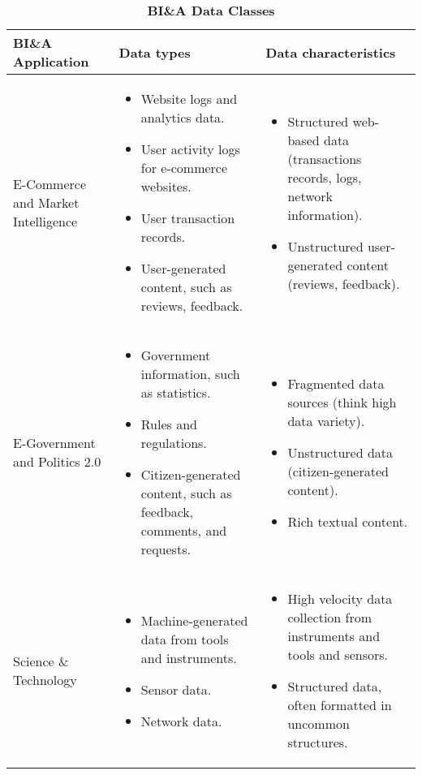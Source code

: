 \begin{landscape}

\begin{table}[H]
\footnotesize
\centering
\caption{\textbf{BI\&A Data Classes}}
\label{tab:bia_data_tab}

\begin{tabular}{ | p{4cm} | p{10cm} | p{10cm} | }

\hline
\textbf{BI\&A Application} & \textbf{Data types} & \textbf{Data characteristics} \\ \hline

E-Commerce and Market Intelligence
&
\begin{itemize}[leftmargin=*]
  \item Website logs and analytics data.
  \item User activity logs for e-commerce websites.
  \item User transaction records.
  \item User-generated content, such as reviews, feedback.
\end{itemize}
&
\begin{itemize}[leftmargin=*]
  \item Structured web-based data (transactions records, logs, network information).
  \item Unstructured user-generated content (reviews, feedback).
\end{itemize}
\\ \hline

E-Government and Politics 2.0
&
\begin{itemize}[leftmargin=*]
  \item Government information, such as statistics.
  \item Rules and regulations.
  \item Citizen-generated content, such as feedback, comments, and requests.
\end{itemize}
&
\begin{itemize}[leftmargin=*]
  \item Fragmented data sources (think high data variety).
  \item Unstructured data (citizen-generated content).
  \item Rich textual content.
\end{itemize}
\\ \hline

Science \& Technology
&
\begin{itemize}[leftmargin=*]
  \item Machine-generated data from tools and instruments.
  \item Sensor data.
  \item Network data.
\end{itemize}
&
\begin{itemize}[leftmargin=*]
  \item High velocity data collection from instruments and tools and sensors.
  \item Structured data, often formatted in uncommon structures.
\end{itemize}
\\ \hline


\end{tabular}
\end{table}
\end{landscape}

